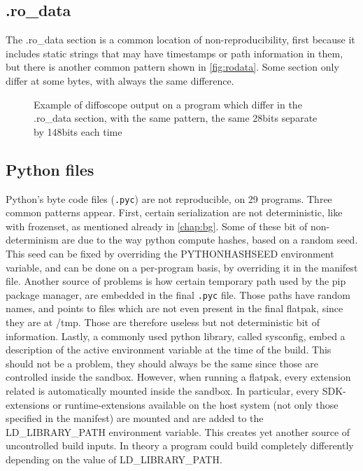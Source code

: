 \documentclass[a4paper,11pt,oneside]{report}
\theoremstyle{definition}
\newcommand{\fp}{flatpak\xspace}
\newcommand{\ldlp}{LD\_LIBRARY\_PATH\xspace}
\newcommand{\dfc}{diffoscope\xspace}
\begin{document}
\subsection*{.ro\_data}
The .ro\_data section is a common location of non-reproducibility, first
because it includes static strings that may have timestamps or path information
in them, but there is another common pattern shown in \autoref{fig:rodata}.
Some section only differ at some bytes, with always the same difference.
\begin{figure}[h]
    \caption{Example of \dfc output on a program which differ in the .ro\_data
    section, with the same pattern, the same 28bits separate by 148bits each
    time}
    \label{fig:rodata}
\end{figure}

\subsection*{Python files}
Python's byte code files (\verb|.pyc|) are not reproducible, on 29 programs.
Three common patterns appear. First, certain serialization are not
deterministic, like with frozenset, as mentioned already in \autoref{chap:bg}.
Some of these bit of non-determinism are due to the way python compute hashes,
based on a random seed. This seed can be fixed by overriding the PYTHONHASHSEED
environment variable, and can be done on a per-program basis, by
overriding it in the manifest file. Another source of problems is how certain
temporary path used by the pip package manager, are embedded in the final
\verb|.pyc| file. Those paths have random names, and points to files which are
not even present in the final \fp, since they are at /tmp. Those are therefore
useless but not deterministic bit of information.
Lastly, a commonly used python library, called sysconfig, embed a description
of the active environment variable at the time of the build. This should not be
a problem, they should always be the same since those are controlled
inside the sandbox. However, when running a \fp, every extension related is
automatically mounted inside the sandbox. In particular, every SDK-extensions
or runtime-extensions available on the host system (not only those specified in
the manifest) are mounted and are added to the \ldlp environment variable. This
creates yet another source of uncontrolled build inputs. In theory a program
could build completely differently depending on the value of \ldlp.
\end{document}
